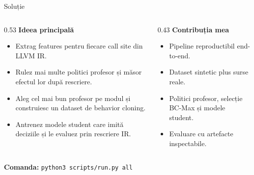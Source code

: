 \documentclass[aspectratio=169,11pt]{beamer}
\begin{document}
\begin{frame}{Soluție}
\begin{columns}[T,onlytextwidth]
\begin{column}{0.53\textwidth}
\textbf{Ideea principală}
\begin{itemize}
  \item Extrag features pentru fiecare call site din LLVM IR.
  \item Rulez mai multe politici profesor și măsor efectul lor după rescriere.
  \item Aleg cel mai bun profesor pe modul și construiesc un dataset de behavior cloning.
  \item Antrenez modele student care imită deciziile și le evaluez prin rescriere IR.
\end{itemize}
\end{column}
\begin{column}{0.43\textwidth}
\textbf{Contribuția mea}
\begin{itemize}
  \item Pipeline reproductibil end-to-end.
  \item Dataset sintetic plus surse reale.
  \item Politici profesor, selecție BC-Max și modele student.
  \item Evaluare cu artefacte inspectabile.
\end{itemize}
\end{column}
\end{columns}
\vspace{0.18cm}
\centering\textbf{Comanda:} \texttt{python3 scripts/run.py all}
\end{frame}
\end{document}
